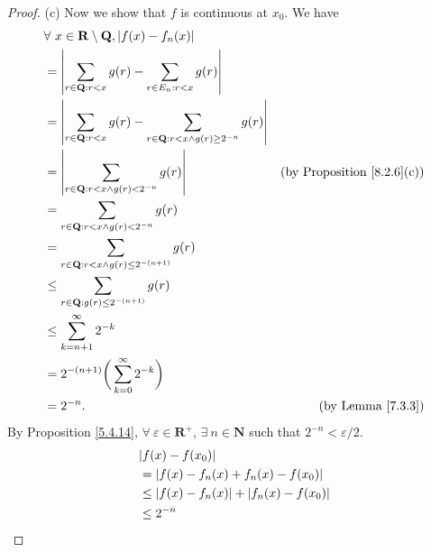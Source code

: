 \begin{proof}{(c)}
    Now we show that \(f\) is continuous at \(x_0\).
    We have
    \begin{align*}
        & \forall\ x \in \mathbf{R} \setminus \mathbf{Q}, \abs*{f(x) - f_n(x)} \\
        & = \abs*{\sum_{r \in \mathbf{Q} : r < x} g(r) - \sum_{r \in E_n : r < x} g(r)} \\
        & = \abs*{\sum_{r \in \mathbf{Q} : r < x} g(r) - \sum_{r \in \mathbf{Q} : r < x \land g(r) \geq 2^{-n}} g(r)} \\
        & = \abs*{\sum_{r \in \mathbf{Q} : r < x \land g(r) < 2^{-n}} g(r)} & \text{(by Proposition \ref{8.2.6}(c))} \\
        & = \sum_{r \in \mathbf{Q} : r < x \land g(r) < 2^{-n}} g(r) \\
        & = \sum_{r \in \mathbf{Q} : r < x \land g(r) \leq 2^{-(n + 1)}} g(r) \\
        & \leq \sum_{r \in \mathbf{Q} : g(r) \leq 2^{-(n + 1)}} g(r) \\
        & \leq \sum_{k = n + 1}^\infty 2^{-k} \\
        & = 2^{-(n + 1)} \bigg(\sum_{k = 0}^\infty 2^{-k}\bigg) \\
        & = 2^{-n}. & \text{(by Lemma \ref{7.3.3})}
    \end{align*}
    By Proposition \ref{5.4.14}, \(\forall\ \varepsilon \in \mathbf{R}^+\), \(\exists\ n \in \mathbf{N}\) such that \(2^{-n} < \varepsilon / 2\).
    \begin{align*}
        & \abs*{f(x) - f(x_0)} \\
        & = \abs*{f(x) - f_n(x) + f_n(x) - f(x_0)} \\
        & \leq \abs*{f(x) - f_n(x)} + \abs*{f_n(x) - f(x_0)} \\
        & \leq 2^{-n}
    \end{align*}
\end{proof}